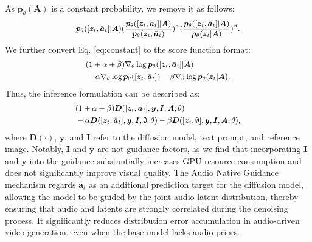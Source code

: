 As $\bm{p}_{\theta}(\bm{A})$ is a constant probability, we remove it as follows:
\begin{equation}\small 
\label{eq:constant}
\begin{aligned}
     \bm{p}_{\theta}([\bm{z}_{t}, \bar{\bm{a}}_{t}] | \bm{A})(\frac{\bm{p}_{\theta}([\bm{z}_{t}, \bar{\bm{a}}_{t}]|\bm{A})}{\bm{p}_{\theta}(\bm{z}_{t}, \bar{\bm{a}}_{t})})^{\alpha}(\frac{\bm{p}_{\theta}([\bm{z}_{t}, \bar{\bm{a}}_{t}]|\bm{A})}{\bm{p}_{\theta}(\bm{z}_{t}|\bm{A})})^{\beta}.
\end{aligned}
\end{equation}
We further convert Eq. \ref{eq:constant} to the score function format:
\begin{equation}\small 
\label{eq:score_function}
\begin{aligned}
     &(1+\alpha+\beta)\nabla_{\theta}\log\bm{p}_{\theta}([\bm{z}_{t}, \bar{\bm{a}}_{t}]|\bm{A}) \\
     &-\alpha\nabla_{\theta}\log\bm{p}_{\theta}([\bm{z}_{t}, \bar{\bm{a}}_{t}])-\beta\nabla_{\theta}\log\bm{p}_{\theta}(\bm{z}_{t}|\bm{A}).
\end{aligned}
\end{equation}
Thus, the inference formulation can be described as:
\begin{equation}\small 
\label{eq:inference}
\begin{aligned}
     &(1+\alpha+\beta)\bm{D}([\bm{z}_{t}, \bar{\bm{a}}_{t}],\bm{y}, \bm{I}, \bm{A};\theta) \\
     &-\alpha\bm{D}([\bm{z}_{t}, \bar{\bm{a}}_{t}],\bm{y}, \bm{I}, \emptyset;\theta)-\beta\bm{D}([\bm{z}_{t}, \emptyset], \bm{y}, \bm{I}, \bm{A};\theta),
\end{aligned}
\end{equation}
where $\bm{D}(\cdot)$, $\bm{y}$, and $\bm{I}$ refer to the diffusion model, text prompt, and reference image. Notably, $\bm{I}$ and $\bm{y}$ are not guidance factors, as we find that incorporating $\bm{I}$ and $\bm{y}$ into the guidance substantially increases GPU resource consumption and does not significantly improve visual quality.
The Audio Native Guidance mechanism regards $\bar{\bm{a}}_{t}$ as an additional prediction target for the diffusion model, allowing the model to be guided by the joint audio-latent distribution, thereby ensuring that audio and latents are strongly correlated during the denoising process. It significantly reduces distribution error accumulation in audio-driven video generation, even when the base model lacks audio priors.

